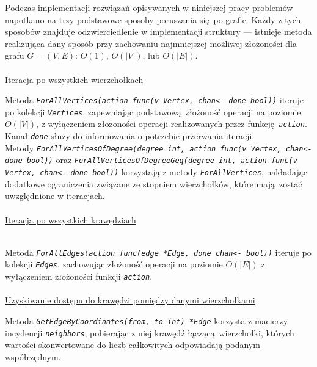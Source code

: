 {  Podczas implementacji rozwiązań opisywanych w niniejszej pracy problemów napotkano na trzy podstawowe sposoby poruszania się po grafie.
  Każdy z tych sposobów znajduje odzwierciedlenie w implementacji struktury --- istnieje metoda realizująca dany sposób przy zachowaniu najmniejszej możliwej złożoności dla grafu $G=(V, E)$: $O(1)$, $O(|V|)$, lub $O(|E|)$.
  \\\\\underline{Iteracja po wszystkich wierzchołkach}\\
  \par{
      Metoda \textit{\lstinline{ForAllVertices(action func(v Vertex, chan<- done bool))}} iteruje po kolekcji \textit{\lstinline{Vertices}}, zapewniając  podstawową złożoność operacji na poziomie $O(|V|)$, z wyłączeniem złożoności operacji realizowanych przez funkcję \textit{\lstinline{action}}. Kanał \textit{\lstinline{done}} służy do informowania o potrzebie przerwania iteracji.\\
      Metody \textit{\lstinline{ForAllVerticesOfDegree(degree int, action func(v Vertex, chan<- done bool))}} oraz \textit{\lstinline{ForAllVerticesOfDegreeGeq(degree int, action func(v Vertex, chan<- done bool))}} korzystają z metody \textit{\lstinline{ForAllVertices}}, nakładając dodatkowe ograniczenia związane ze stopniem wierzchołków, które mają zostać uwzględnione w iteracjach.
  }
  \\\\\underline{Iteracja po wszystkich krawędziach}\\\
  \par{
      Metoda \textit{\lstinline{ForAllEdges(action func(edge *Edge, done chan<- bool))}} iteruje po kolekcji \textit{\lstinline{Edges}}, zachowując złożoność operacji na poziomie $O(|E|)$ z wyłączeniem złożoności funkcji \textit{\lstinline{action}}.
  }
  \\\\\underline{Uzyskiwanie dostępu do krawędzi pomiędzy danymi wierzchołkami}\\
  \par{
      Metoda \textit{\lstinline{GetEdgeByCoordinates(from, to int) *Edge}} korzysta z macierzy incydencji \textit{\lstinline{neighbors}}, pobierając z niej krawędź łączącą wierzchołki, których wartości skonwertowane do liczb całkowitych odpowiadają podanym współrzędnym.

}}
